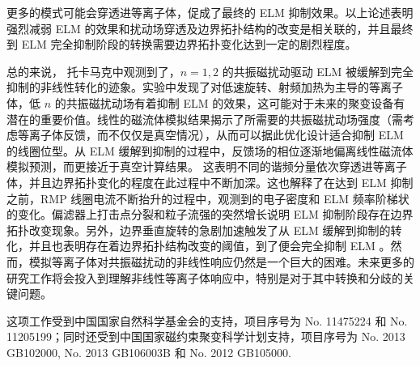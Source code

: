 更多的模式可能会穿透进等离子体，促成了最终的 ELM 抑制效果。以上论述表明强烈减弱 ELM 的效果和扰动场穿透及边界拓扑结构的改变是相关联的，并且最终到 ELM 完全抑制阶段的转换需要边界拓扑变化达到一定的剧烈程度。


总的来说， \east 托卡马克中观测到了，$n=1,2$ 的共振磁扰动驱动 ELM 被缓解到完全抑制的非线性转化的迹象。实验中发现了对低速旋转、射频加热为主导的等离子体，低 $n$ 的共振磁扰动场有着抑制 ELM 的效果，这可能对于未来的聚变设备有潜在的重要价值。线性的磁流体模拟结果揭示了所需要的共振磁扰动场强度（需考虑等离子体反馈，而不仅仅是真空情况），从而可以据此优化设计适合抑制 ELM 的线圈位型。从 ELM 缓解到抑制的过程中，反馈场的相位逐渐地偏离线性磁流体模拟预测，而更接近于真空计算结果。
这表明不同的谐频分量依次穿透进等离子体，并且边界拓扑变化的程度在此过程中不断加深。这也解释了在达到 ELM 抑制之前，RMP 线圈电流不断抬升的过程中，观测到的电子密度和 ELM 频率阶梯状的变化。偏滤器上打击点分裂和粒子流强的突然增长说明 ELM 抑制阶段存在边界拓扑改变现象。另外，边界垂直旋转的急剧加速触发了从 ELM 缓解到抑制的转化，并且也表明存在着边界拓扑结构改变的阈值，到了便会完全抑制 ELM 。然而，模拟等离子体对共振磁扰动的非线性响应仍然是一个巨大的困难。未来更多的研究工作将会投入到理解非线性等离子体响应中，特别是对于其中转换和分歧的关键问题。

这项工作受到中国国家自然科学基金会的支持，项目序号为 No. 11475224 和 No. 11205199；同时还受到中国国家磁约束聚变科学计划支持，项目序号为 No. 2013 GB102000, No. 2013 GB106003B 和 No. 2012 GB105000.

